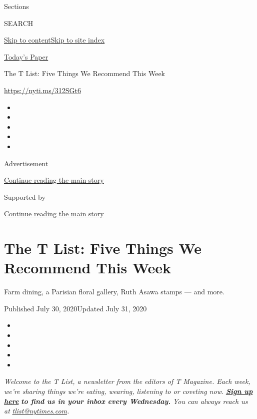 Sections

SEARCH

\protect\hyperlink{site-content}{Skip to
content}\protect\hyperlink{site-index}{Skip to site index}

\href{https://myaccount.nytimes.com/auth/login?response_type=cookie\&client_id=vi}{}

\href{https://www.nytimes.com/section/todayspaper}{Today's Paper}

The T List: Five Things We Recommend This Week

\url{https://nyti.ms/312SGt6}

\begin{itemize}
\item
\item
\item
\item
\item
\end{itemize}

Advertisement

\protect\hyperlink{after-top}{Continue reading the main story}

Supported by

\protect\hyperlink{after-sponsor}{Continue reading the main story}

\hypertarget{the-t-list-five-things-we-recommend-this-week}{%
\section{The T List: Five Things We Recommend This
Week}\label{the-t-list-five-things-we-recommend-this-week}}

Farm dining, a Parisian floral gallery, Ruth Asawa stamps --- and more.

Published July 30, 2020Updated July 31, 2020

\begin{itemize}
\item
\item
\item
\item
\item
\end{itemize}

\emph{Welcome to the T List, a newsletter from the editors of T
Magazine. Each week, we're sharing things we're eating, wearing,
listening to or coveting now.}
\textbf{\href{https://www.nytimes.com/newsletters/t-list?module=inline}{\emph{Sign
up here}}} \emph{\textbf{to find us in your inbox every Wednesday.}}
\emph{You can always reach us at}
\href{mailto:tlist@nytimes.com}{\emph{tlist@nytimes.com}}\emph{.}

